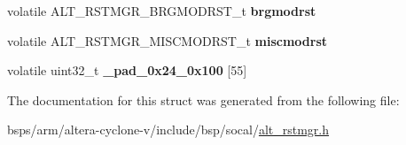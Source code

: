 \begin{DoxyCompactItemize}
volatile A\+L\+T\+\_\+\+R\+S\+T\+M\+G\+R\+\_\+\+B\+R\+G\+M\+O\+D\+R\+S\+T\+\_\+t {\bfseries brgmodrst}
\item 
\mbox{\label{structALT__RSTMGR__s_a1bc6fbfa2e97d3273b264078b95ca9f6}} 
volatile A\+L\+T\+\_\+\+R\+S\+T\+M\+G\+R\+\_\+\+M\+I\+S\+C\+M\+O\+D\+R\+S\+T\+\_\+t {\bfseries miscmodrst}
\item 
\mbox{\label{structALT__RSTMGR__s_acfe96fe83cb4af8eb0bbe26f04552a96}} 
volatile uint32\+\_\+t {\bfseries \+\_\+pad\+\_\+0x24\+\_\+0x100} \mbox{[}55\mbox{]}
\end{DoxyCompactItemize}


The documentation for this struct was generated from the following file\+:\begin{DoxyCompactItemize}
\item 
bsps/arm/altera-\/cyclone-\/v/include/bsp/socal/\mbox{\hyperlink{alt__rstmgr_8h}{alt\+\_\+rstmgr.\+h}}\end{DoxyCompactItemize}
